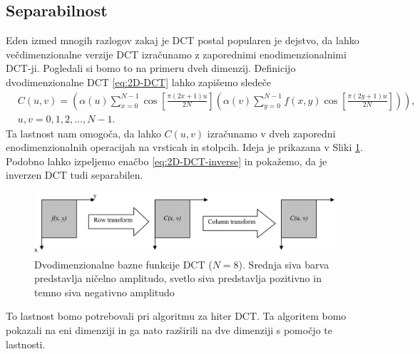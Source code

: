 \documentclass[a4paper,12pt,openright]{book}
\begin{document}
\subsection{Separabilnost} \label{Separabilnost}%
Eden izmed mnogih razlogov zakaj je DCT postal popularen je dejstvo, da lahko večdimenzionalne verzije DCT izračunamo z zaporednimi enodimenzionalnimi DCT-ji. Pogledali si bomo to na primeru dveh dimenzij. Definicijo dvodimenzionalne DCT \ref{eq:2D-DCT} lahko zapišemo sledeče
\begin{equation}
    \begin{aligned}
    &C(u,v) = \left(\alpha(u)  \sum_{x=0}^{N-1}\cos\left[\frac{\pi(2x+1)u}{2N}\right]
              \left(\alpha(v)  \sum_{y=0}^{N-1} f(x,y)\cos\left[\frac{\pi(2y+1)u}{2N}\right]\right)\right), \\
    &u,v = 0,1,2,\ldots,N-1.
    \end{aligned}
\label{eq:2D-DCT_Separabilnost}
\end{equation}
Ta lastnost nam omogoča, da lahko $C(u,v)$ izračunamo v dveh zaporedni enodimenzionalnih operacijah na vrsticah in stolpcih. Ideja je prikazana v Sliki \ref{Prikaz_separabilnosti}. Podobno lahko izpeljemo enačbo \ref{eq:2D-DCT-inverse} in pokažemo, da je inverzen DCT tudi separabilen.\par


\begin{figure}[ht] %
\begin{center}
\includegraphics[width=1\textwidth]{slike/Prikaz_Separabilnosti.pdf}
\end{center}
\caption{Dvodimenzionalne bazne funkcije DCT ($N=8$). Srednja siva barva predstavlja ničelno amplitudo, svetlo siva predstavlja pozitivno in temno siva negativno amplitudo}
\label{Prikaz_separabilnosti}
\end{figure}

To lastnost bomo potrebovali pri algoritmu za hiter DCT. Ta algoritem bomo pokazali na eni dimenziji in ga nato razširili na dve dimenziji s pomočjo te lastnosti.
\end{document}
